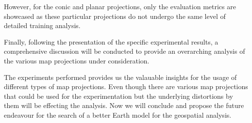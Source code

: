 However, for the conic and planar projections, only the evaluation metrics are showcased as these particular projections do not undergo the same level of detailed training
analysis.

Finally, following the presentation of the specific experimental results, a comprehensive discussion will be conducted to provide an overarching analysis of the
various map projections under consideration.

\clearpage

\clearpage

\clearpage


\clearpage



The experiments performed provides us the valauable insights for the usage of different types of map projections. Even though there are various map projections that could be used for the experimentation but the underlying
distortions by them will be effecting the analysis. Now we will conclude and propose the future endeavour for the search of a better Earth model for the geospatial analysis.